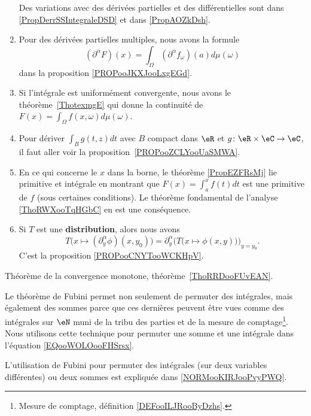 \begin{description}
\begin{enumerate}
                Des variations avec des dérivées partielles et des différentielles sont dans \ref{PropDerrSSIntegraleDSD} et dans \ref{PropAOZkDsh}.
            \item
                Pour des dérivées partielles multiples, nous avons la formule
                \begin{equation}
                    (\partial^{\alpha}F)(x)=\int_{\Omega}(\partial^{\alpha}f_{\omega})(a)d\mu(\omega)
                \end{equation}
                dans la proposition \ref{PROPooJKXJooLxgEGd}.
            \item
                Si l'intégrale est uniformément convergente, nous avons le théorème~\ref{ThotexmgE} qui donne la continuité de $F(x)=\int_{\Omega}f(x,\omega)d\mu(\omega)$.
            \item
                Pour dériver \( \int_Bg(t,z)dt\) avec \( B\) compact dans \( \eR\) et \( g\colon \eR\times \eC\to \eC\), il faut aller voir la proposition~\ref{PROPooZCLYooUaSMWA}.
            \item
                En ce qui concerne le \( x\) dans la borne, le théorème \ref{PropEZFRsMj} lie primitive et intégrale en montrant que \( F(x)=\int_a^xf(t)dt\) est une primitive de \( f\) (sous certaines conditions). Le théorème fondamental de l'analyse \ref{ThoRWXooTqHGbC} en est une conséquence.
            \item Si \( T\) est une \textbf{distribution}, alors nous avons
                \begin{equation}
                    T\big( x\mapsto (\partial_y^{\alpha}\phi)(x,y_0) \big)=\partial_y^{\alpha}\Big( T\big( x\mapsto \phi(x,y) \big) \Big)_{y=y_0}.
                \end{equation}
                C'est la proposition \ref{PROPooCNYTooWCKHpV}.
        \end{enumerate}
    \item[Convergence monotone]
        Théorème de la convergence monotone, théorème~\ref{ThoRRDooFUvEAN}.
    \item[Fubini]
        Le théorème de Fubini permet non seulement de permuter des intégrales, mais également des sommes parce que ces dernières peuvent être vues comme des intégrales sur \( \eN\) muni de la tribu des parties et de la mesure de comptage\footnote{Mesure de comptage, définition \ref{DEFooILJRooByDzhs}.}. Nous utilisons cette technique pour permuter une somme et une intégrale dans l'équation \eqref{EQooWOLOooFHSrsx}.
    \item
        L'utilisation de Fubini pour permuter des intégrales (sur deux variables différentes) ou deux sommes est expliquée dans \ref{NORMooKIRJooPvyPWQ}. 


\end{description}
